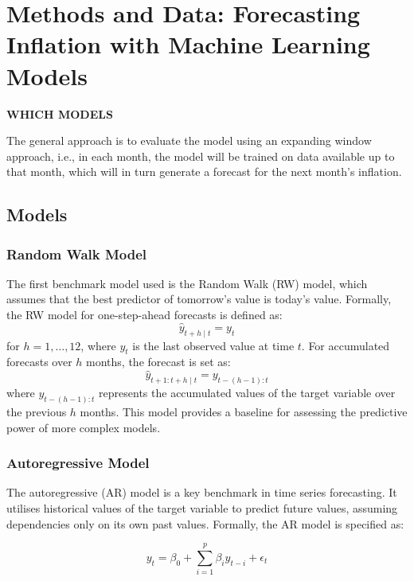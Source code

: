 \pagebreak
\section{Methods and Data: Forecasting Inflation with Machine Learning Models} \label{sec:methods}


\textbf{WHICH MODELS}

The general approach is to evaluate the model using an expanding window approach, i.e., in each month, the model will be trained on data available up to that month, which will in turn generate a forecast for the next month's inflation. 



\subsection{Models} \label{sec:methods_models}

\subsubsection{Random Walk Model}

The first benchmark model used is the Random Walk (RW) model, which assumes that the best predictor of tomorrow's value is today's value. Formally, the RW model for one-step-ahead forecasts is defined as:
\begin{equation}
    \widehat{y}_{t+h \mid t} = y_t
\end{equation}
for $h=1, \ldots, 12$, where $y_t$ is the last observed value at time $t$. For accumulated forecasts over $h$ months, the forecast is set as:
\begin{equation}
    \widehat{y}_{t+1:t+h \mid t} = y_{t-(h-1):t}
\end{equation}
where $y_{t-(h-1):t}$ represents the accumulated values of the target variable over the previous $h$ months. This model provides a baseline for assessing the predictive power of more complex models.

\subsubsection{Autoregressive Model}

The autoregressive (AR) model is a key benchmark in time series forecasting. It utilises historical values of the target variable to predict future values, assuming dependencies only on its own past values. Formally, the AR model is specified as:

\begin{equation}
    y_t = \beta_0 + \sum_{i=1}^{p} \beta_i y_{t-i} + \epsilon_t
\end{equation}

